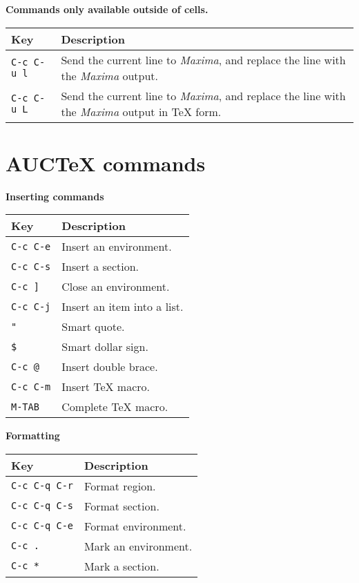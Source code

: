 \documentclass{article}
\newcommand{\mx}{\textsl{\sffamily Maxima}}
\begin{document}
\smallskip

\noindent
\textbf{Commands only available outside of cells.}

\smallskip

\noindent
\begin{tabular}{p{\firstcol}p{\secondcol}}
\hline
\textbf{Key} & \textbf{Description}\\
\hline
\texttt{C-c C-u l}
& Send the current line to \mx{}, and replace the line with the
\mx{} output.\\
\texttt{C-c C-u L}
& Send the current line to \mx{}, and replace the line with the
\mx{} output in \TeX{} form.
\end{tabular}


\section{AUC\TeX{} commands}

\smallskip

\noindent
\textbf{Inserting commands}

\smallskip

\noindent
\begin{tabular}{p{\firstcol}p{\secondcol}}
\hline
\textbf{Key} & \textbf{Description}\\
\hline
\texttt{C-c C-e}
& Insert an environment.\\
\texttt{C-c C-s}
& Insert a section.\\
\texttt{C-c ]}
& Close an environment.\\
\texttt{C-c C-j}
& Insert an item into a list.\\
\texttt{"}
& Smart quote.\\
\texttt{\$}
& Smart dollar sign.\\
\texttt{C-c @}
& Insert double brace.\\
\texttt{C-c C-m}
& Insert \TeX{} macro.\\
\texttt{M-TAB}
& Complete \TeX{} macro.\\
\end{tabular}

\smallskip

\noindent
\textbf{Formatting}

\smallskip

\noindent
\begin{tabular}{p{\firstcol}p{\secondcol}}
\hline
\textbf{Key} & \textbf{Description}\\
\hline
\texttt{C-c C-q C-r}
& Format region.\\
\texttt{C-c C-q C-s}
& Format section.\\
\texttt{C-c C-q C-e}
& Format environment.\\
\texttt{C-c .}
& Mark an environment.\\
\texttt{C-c *}
& Mark a section.
\end{tabular}
\end{document}

